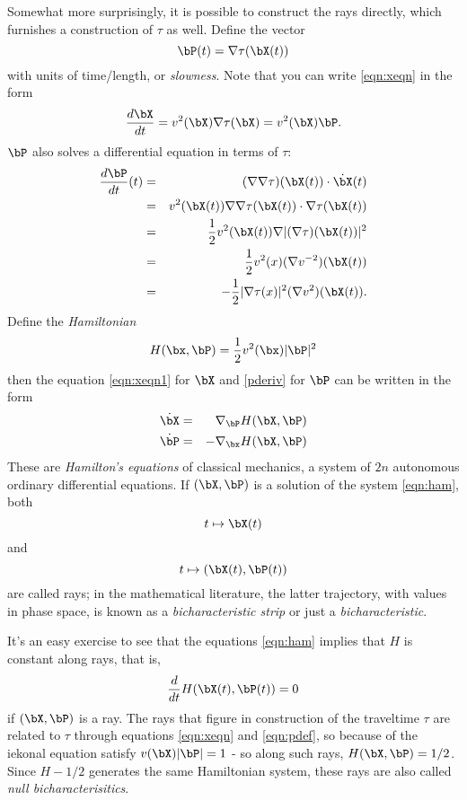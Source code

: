 Somewhat more surprisingly, it is possible
to construct the rays directly, which furnishes a construction of $\tau$ as
well. Define the vector 
\begin{equation}
\label{eqn:pdef}
\bP(t) = \nabla\tau(\bX(t))
\end{equation}
with units of time/length, or {\em slowness}. Note that you can write \ref{eqn:xeqn} in the form
\begin{equation}
\label{eqn:xeqn1}
\frac{d\bX}{dt} = v^2(\bX) \nabla\tau(\bX) = v^2(\bX) \bP.
\end{equation}
$\bP$ also solves a differential equation in terms of $\tau$:
\begin{eqnarray}
\label{eqn:pderiv}
\frac{d \bP}{dt}(t) & = & (\nabla\nabla\tau)(\bX(t)) \cdot \dot{\bX}(t)\\
& = & v^2(\bX(t))\nabla\nabla\tau(\bX(t)) \cdot \nabla\tau(\bX(t))\\
& = & \frac{1}{2} v^2(\bX(t))\nabla | (\nabla\tau)(\bX(t))|^2\\
& = & \frac{1}{2} v^2(x)(\nabla v^{-2})(\bX(t))\\
& = & - \frac{1}{2} |\nabla\tau(x)|^2(\nabla v^{2})(\bX(t)).
\end{eqnarray}
Define the {\em Hamiltonian}
\begin{equation}
\label{eqn:hamdef}
H(\bx,\bP) = \frac{1}{2}v^{2}(\bx)|\bP|^2
\end{equation}
then the equation \ref{eqn:xeqn1} for $\bX$ and \ref{pderiv} for $\bP$ can be written in the form
\begin{eqnarray}
\label{eqn:ham}
\dot{\bX} & = & \nabla_{\bP} H(\bX,\bP)\\
\dot{\bP} & = & -\nabla_{\bx} H(\bX,\bP)
\end{eqnarray}
These are  {\em Hamilton's equations} of classical mechanics, a system
of $2n$ autonomous ordinary differential equations. If $(\bX,\bP)$ is
a solution of the system \ref{eqn:ham}, both
\[
t \mapsto \bX(t)
\]
and
\[
t \mapsto (\bX(t),\bP(t))
\]
are called rays; in the mathematical literature, the latter
trajectory, with values in phase space, is known as a {\em
  bicharacteristic strip} or just a {\em bicharacteristic}. 

It's an easy exercise to see that the equations \ref{eqn:ham} implies that $H$ is constant along rays, that is,
\begin{equation}
\label{eqn:constH}
\frac{d}{dt}H(\bX(t),\bP(t)) = 0
\end{equation}
if $(\bX,\bP)$ is a ray. The rays that figure in construction of the traveltime $\tau$ 
are related to $\tau$ through equations \ref{eqn:xeqn} and \ref{eqn:pdef}, so because of the iekonal equation satisfy $v(\bX)|\bP| = 1$ - so along such rays,
$H(\bX,\bP)=1/2$. Since $H-1/2$ generates the same Hamiltonian system,
these rays are also called {\em null bicharacterisitics}. 

